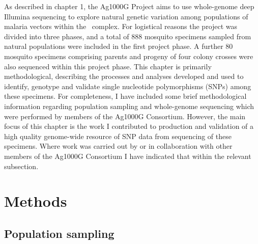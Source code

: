 \documentclass[a4paper,11pt,abstracton,hidelinks]{scrartcl}
\begin{document}
As described in chapter 1, the Ag1000G Project aims to use whole-genome deep Illumina sequencing to explore natural genetic variation among populations of malaria vectors within the \agam\ complex.
%
For logistical reasons the project was divided into three phases, and a total of 888 mosquito specimens sampled from natural populations were included in the first project phase.
%
A further 80 mosquito specimens comprising parents and progeny of four colony crosses were also sequenced within this project phase.
%
This chapter is primarily methodological, describing the processes and analyses developed and used to identify, genotype and validate single nucleotide polymorphisms (SNPs) among these specimens.
%
For completeness, I have included some brief methodological information regarding population sampling and whole-genome sequencing which were performed by members of the Ag1000G Consortium.
%
However, the main focus of this chapter is the work I contributed to production and validation of a high quality genome-wide resource of SNP data from sequencing of these specimens.
%
Where work was carried out by or in collaboration with other members of the Ag1000G Consortium I have indicated that within the relevant subsection.



\section{Methods}\label{sec:methods}


\subsection{Population sampling}\label{subsec:population-sampling}
\end{document}
